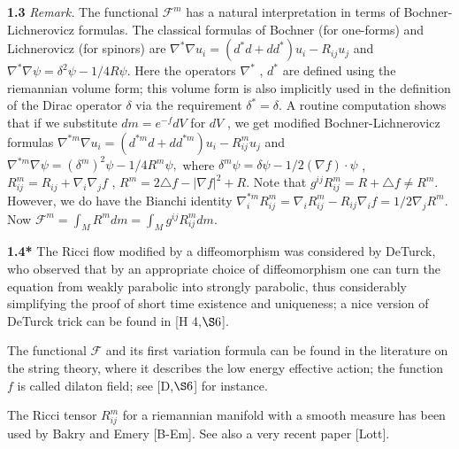 \documentclass[12pt]{article}
\newcommand{\cF}{\mathcal {F}}
\theoremstyle{plain}
{\swapnumbers
\newtheorem{thm}{Theorem}[section]
\newtheorem{cor}[thm]{Corollary}
\newtheorem{lem}[thm]{Lemma}
\newtheorem{prop}[thm]{Proposition}
}
\theoremstyle{definition}
{\swapnumbers
\newtheorem{defn}[thm]{Definition}
\newtheorem{nota}[thm]{Notation}
\newtheorem{parag}[thm]{}
\newtheorem*{parstr}{\addtocounter{thm}{1}\thesection.\arabic{thm}*}
\newtheorem*{intropar}{\addtocounter{thm}{1}\arabic{thm}}
}
\theoremstyle{remark} {\swapnumbers
\newtheorem{rem}[thm]{Remark}
\newtheorem{exam}[thm]{Example}
\newtheorem{lemma}[thm]{Lemma}
\newtheorem{claim}[thm]{Claim}
}
\numberwithin{equation}{section}
\begin{document}
\par {\bf 1.3} {\it Remark.}
 The functional $\cF^m $ has a natural interpretation in terms of
Bochner-Lichnerovicz formulas. The classical formulas of Bochner
(for one-forms) and Lichnerovicz (for spinors) are $\nabla^*\nabla
u_i=(d^*d+dd^*)u_i-R_{ij}u_j$ and $\nabla^*\nabla
\psi=\delta^2\psi-1/4 R\psi.$  Here the operators $\nabla^*$ ,
$d^*$ are defined using the riemannian volume form; this volume
form is also implicitly used in the definition of the Dirac
operator $\delta$ via the requirement $\delta^*=\delta.$  A
routine computation shows that  if we substitute $dm=e^{-f}dV$ for
$dV$ , we get modified Bochner-Lichnerovicz formulas
$\nabla^{*m}\nabla u_i=(d^{*m}d+dd^{*m})u_i-R_{ij}^m u_j $ and
$\nabla^{*m}\nabla\psi=(\delta^m)^2\psi-1/4R^m\psi,$ where
$\delta^m\psi=\delta\psi-1/2(\nabla f)\cdot\psi$ ,
$R_{ij}^m=R_{ij}+\nabla_i\nabla_j f$ , $R^m=2\triangle f-|\nabla
f|^2 +R .$ Note that $g^{ij}R_{ij}^m= R + \triangle f \ne R^m .$
However, we do have the Bianchi identity
$\nabla_i^{*m}R_{ij}^m=\nabla_iR_{ij}^m-R_{ij}\nabla_i
f=1/2\nabla_jR^m .$ Now
$\cF^m=\int_M{{R^m}dm}=\int_M{g^{ij}R_{ij}^m dm}.$

\par {\bf 1.4*}
 The Ricci flow modified by a diffeomorphism was considered by
DeTurck, who observed that by an appropriate choice of
diffeomorphism one can turn the equation from weakly parabolic
into strongly parabolic, thus considerably simplifying the proof
of short time existence and uniqueness; a nice version of DeTurck
trick can be found in [H 4,$\S 6$].
\par The functional $\cF$ and its first variation formula can be
found in the literature on the string theory, where it describes
the low energy effective action; the function $f$ is called
dilaton field; see [D,$\S 6$] for instance.
\par The Ricci tensor $R_{ij}^m$ for a riemannian manifold with a
smooth measure has been used  by Bakry and Emery [B-Em]. See also
a very recent paper [Lott].
\end{document}
